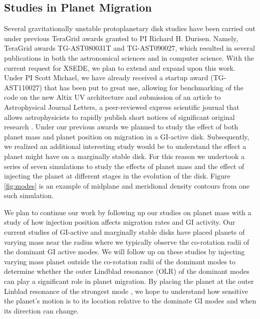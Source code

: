 \documentclass[12pt,preprint2]{aastex}
\begin{document}
\subsection{Studies in Planet Migration} \label{sec:migplan}

Several gravitationally unstable protoplanetary disk studies have been carried out under previous TeraGrid awards granted
to PI Richard H. Durisen. Namely, TeraGrid awards TG-AST080031T and TG-AST090027, which resulted in several publications
\citep{henschel2010,michael2010a,michael2010b,michael2011a} in both the astronomical sciences and in computer
science. With the current request for XSEDE, we plan to extend and expand upon this work. Under PI Scott Michael, we
have already received a startup award (TG-AST110027) that has been put to great use, allowing for benchmarking of the
code on the new Altix UV architecture and submission of an article to Astrophysical Journal Letters, a peer-reviewed
express scientific journal that allows astrophysicists to rapidly publish short notices of significant original research
\citep{michael2011b}. Under our previous awards we planned to study the effect of both planet mass and planet position
on migration in a GI-active disk. Subsequently, we realized an additional interesting study would be to understand the
effect a planet might have on a marginally stable disk. For this reason we undertook a series of seven simulations to
study the effects of planet mass and the effect of injecting the planet at different stages in the evolution of the
disk. Figure \ref{fig:modes} is an example of midplane and meridional density contours from one such simulation.

We plan to continue our work by following up our studies on planet mass with a study of how injection position affects
migration rates and GI activity. Our current studies of GI-active and marginally stable disks have placed planets of
varying mass near the radius where we typically observe the co-rotation radii of the dominant GI active modes. We will
follow up on these studies by injecting varying mass planet outside the co-rotation radii of the dominant modes to
determine whether the outer Lindblad resonance (OLR) of the dominant modes can play a significant role in planet
migration. By placing the planet at the outer Linblad resonance of the strongest mode \citep{binney1987}, we hope to
understand how sensitive the planet's motion is to its location relative to the dominate GI modes and when its direction
can change.
\end{document}
